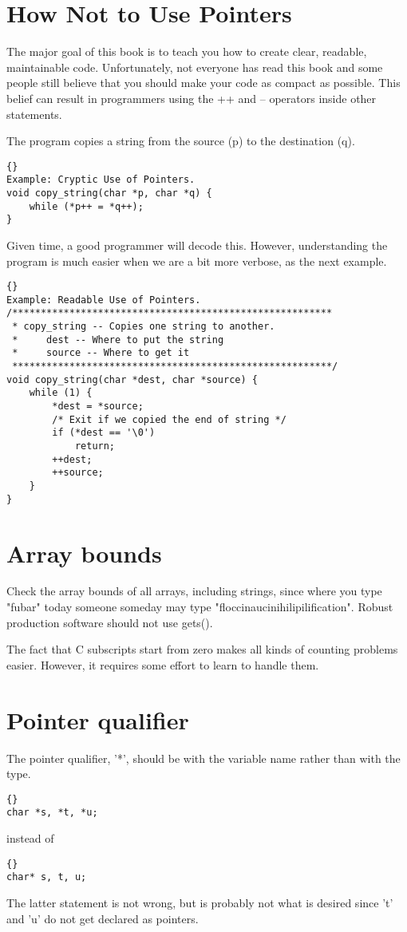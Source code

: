 \documentclass{report}
\begin{document}
\section{How Not to Use Pointers}
The major goal of this book is to teach you how to create clear, readable, maintainable code. Unfortunately, not everyone has read this book and some people still believe that you should make your code as compact as possible. This belief can result in programmers using the ++ and -- operators inside other statements.

The program copies a string from the source (p) to the destination (q). 
\begin{lstlisting}{}
Example: Cryptic Use of Pointers.
void copy_string(char *p, char *q) {
    while (*p++ = *q++);
}
\end{lstlisting}
Given time, a good programmer will decode this. However, understanding the program is much easier when we are a bit more verbose, as the next example.
\begin{lstlisting}{}
Example: Readable Use of Pointers.
/********************************************************
 * copy_string -- Copies one string to another.
 *     dest -- Where to put the string
 *     source -- Where to get it
 ********************************************************/
void copy_string(char *dest, char *source) {
    while (1) {
        *dest = *source;
        /* Exit if we copied the end of string */
        if (*dest == '\0')
            return;
        ++dest;
        ++source;
    }
}
\end{lstlisting}

\section{Array bounds}
Check the array bounds of all arrays, including strings, since where you type "fubar" today someone someday may type "floccinaucinihilipilification". Robust production software should not use gets().

The fact that C subscripts start from zero makes all kinds of counting problems easier. However, it requires some effort to learn to handle them.

\section{Pointer qualifier} 
The pointer qualifier, '*', should be with the variable name rather than with the type.
\begin{lstlisting}{} 
char *s, *t, *u;
\end{lstlisting}
instead of 
\begin{lstlisting}{}
char* s, t, u;
\end{lstlisting}
The latter statement is not wrong, but is probably not what is desired since 't' and 'u' do not get declared as pointers.
\end{document}
